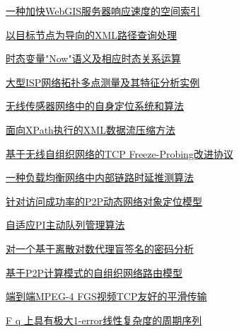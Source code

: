 \documentclass[a4paper]{article}
\begin{document}
\href{http://www.jos.org.cn/ch/reader/download_pdf.aspx?file_no=20050521&year_id=2005&quarter_id=5&falg=1}{一种加快WebGIS服务器响应速度的空间索引}

\href{http://www.jos.org.cn/ch/reader/download_pdf.aspx?file_no=20050522&year_id=2005&quarter_id=5&falg=1}{以目标节点为导向的XML路径查询处理}

\href{http://www.jos.org.cn/ch/reader/download_pdf.aspx?file_no=20050523&year_id=2005&quarter_id=5&falg=1}{时态变量"Now"语义及相应时态关系运算}

\href{http://www.jos.org.cn/ch/reader/download_pdf.aspx?file_no=20050524&year_id=2005&quarter_id=5&falg=1}{大型ISP网络拓扑多点测量及其特征分析实例}

\href{http://www.jos.org.cn/ch/reader/download_pdf.aspx?file_no=20050525&year_id=2005&quarter_id=5&falg=1}{无线传感器网络中的自身定位系统和算法}

\href{http://www.jos.org.cn/ch/reader/download_pdf.aspx?file_no=20050526&year_id=2005&quarter_id=5&falg=1}{面向XPath执行的XML数据流压缩方法}

\href{http://www.jos.org.cn/ch/reader/download_pdf.aspx?file_no=20050527&year_id=2005&quarter_id=5&falg=1}{基于无线自组织网络的TCP Freeze-Probing改进协议}

\href{http://www.jos.org.cn/ch/reader/download_pdf.aspx?file_no=20050528&year_id=2005&quarter_id=5&falg=1}{一种负载均衡网络中内部链路时延推测算法}

\href{http://www.jos.org.cn/ch/reader/download_pdf.aspx?file_no=20050529&year_id=2005&quarter_id=5&falg=1}{针对访问成功率的P2P动态网络对象定位模型}

\href{http://www.jos.org.cn/ch/reader/download_pdf.aspx?file_no=20050530&year_id=2005&quarter_id=5&falg=1}{自适应PI主动队列管理算法}

\href{http://www.jos.org.cn/ch/reader/download_pdf.aspx?file_no=20050531&year_id=2005&quarter_id=5&falg=1}{对一个基于离散对数代理盲签名的密码分析}

\href{http://www.jos.org.cn/ch/reader/download_pdf.aspx?file_no=20050532&year_id=2005&quarter_id=5&falg=1}{基于P2P计算模式的自组织网络路由模型}

\href{http://www.jos.org.cn/ch/reader/download_pdf.aspx?file_no=20050533&year_id=2005&quarter_id=5&falg=1}{端到端MPEG-4 FGS视频TCP友好的平滑传输}

\href{http://www.jos.org.cn/ch/reader/download_pdf.aspx?file_no=20050534&year_id=2005&quarter_id=5&falg=1}{F q 上具有极大1-error线性复杂度的周期序列}
\end{document}
